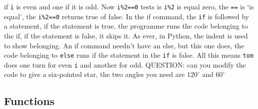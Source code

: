 \documentclass[11pt,a4paper]{scrartcl}
\begin{document}
if \texttt{i} is even and one if it is odd. Now \texttt{i\%2==0} tests
is \texttt{i\%2} is equal zero, the \texttt{==} is \lq{}is equal\rq{},
the \texttt{i\%2==0} returns true of false. In the if command, the
\texttt{if} is followed by a statement, if the statement is true, the
programme runs the code belonging to the if, if the statement is
false, it skips it. As ever, in Python, the indent is used to show
belonging. An if command needn't have an else, but this one does, the
code belonging to \texttt{else} runs if the statement in the
\texttt{if} is false. All this means \texttt{tom} does one turn for
even \texttt{i} and another for odd. QUESTION: can you modify the code
to give a six-pointed star, the two angles you need are $120^\circ$
and $60^\circ$
\begin{center}
\end{center}

\subsection*{Functions}
\end{document}
